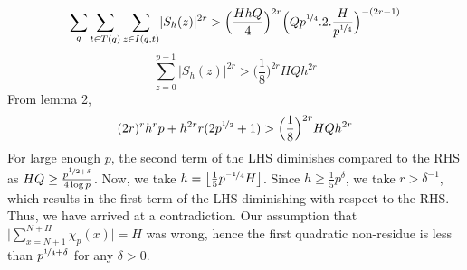 \documentclass{article}
\begin{document}
$$\sum_q\sum\limits_{t\in T(q)}\sum\limits_{z\in I(q,t)}\lvert S_h(z) \rvert^{2r} > \Big( \frac{HhQ}{4}\Big)^{2r}\Big ( Qp^{\nicefrac{1}{4}}.2.\frac{H}{p^{\nicefrac{1}{4}}}\Big )^{-(2r-1)}$$
$$\sum\limits_{z=0}^{p-1}\lvert S_h(z) \rvert^{2r}>\Big(\frac{1}{8}\Big)^{2r}HQh^{2r}$$
From lemma 2,
$$(2r)^{r}h^{r}p+h^{2r}r(2p^{\nicefrac{1}{2}}+1)>\Big(\frac{1}{8}\Big)^{2r}HQh^{2r}$$
For large enough $p$, the second term of the LHS diminishes compared to the RHS as $HQ\geq \frac{p^{\nicefrac{1}{2}+\delta}}{4\log p}$. Now, we take $h=\left \lfloor \frac{1}{5}p^{\nicefrac{-1}{4}}H \right \rfloor$. Since $h \geq \frac{1}{5}p^{\delta}$, we take $r>\delta^{-1}$, which results in the first term of the LHS diminishing with respect to the RHS.
Thus, we have arrived at a contradiction. Our assumption that $\Big \lvert \sum\limits_{x=N+1}^{N+H}\chi_p(x)\Big \rvert=H$ was wrong, hence the first quadratic non-residue is less than $p^{\nicefrac{1}{4}+\delta}$ for any $\delta>0$.



\begin{comment}
YOUR CLASSMATE MUST UNDERSTAND IT

Introduction `
﻿-Consider the roots of the equation ax^2+bx+c=0, where a, b, c \in F_p.We would like to know if such an equation has a root at all.
-x=..... in the field.
-Such a result is used in....
-Exactly half of 0-p-1 are residues
-Can randomly select and test, however, an assured bound is needed, so we study the distribution of residues
-Vinagradov prved p1/2 on which burgess's p1/4 improved.

Lemma 1
The density of blah blah blah and blih blih blih. Given by result Lemma 1 (stated)

Lemma 2
Given Lemma 1, we would like to construct a square-free polynomial which would somehow put a limit on the number of opposite value of kais in an interval. We construct one such by sum over x of (sh(x))^2r.
No wsince blah blah blih bluh blih...as explained to Sir

Proof of p^1/2 bound


Lemma 3
(N+tp)/q to (N+H+tp)/q Finding the correlation between this and other values of the legendre symbol in the range. 
\end{comment}
\end{document}
